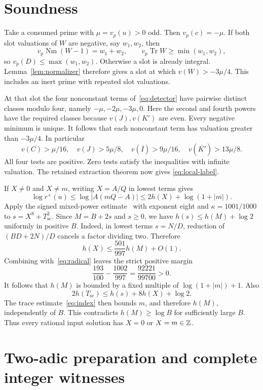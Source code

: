 \documentclass[11pt,a4paper]{article}
\DeclareMathOperator{\Tr}{Tr}\DeclareMathOperator{\Nm}{Nm}
\begin{document}
\section{Soundness}

Take a consumed prime with $\mu=v_p(u)>0$ odd. Then $v_p(c)=-\mu$.
If both slot valuations of $W$ are negative, say $w_1,w_2$, then
\[
 v_p\Nm(W-1)=w_1+w_2,\qquad
 v_p\Tr W\ge\min(w_1,w_2),
\]
so $v_p(D)\le\max(w_1,w_2)$. Otherwise a slot is already integral.
Lemma~\ref{lem:normalizer} therefore gives a slot at which
$v(W)>-3\mu/4$. This includes an inert prime with repeated slot
valuations.

At that slot the four nonconstant terms of~\eqref{eq:detector} have
pairwise distinct classes modulo four, namely $-\mu,-2\mu,-3\mu,0$.
Here the second and fourth powers have the required classes because
$v(J),v(K')$ are even. Every negative minimum is unique. It follows
that each nonconstant term has valuation greater than $-3\mu/4$.
In particular
\[
 v(C)>\mu/16,\quad v(J)>5\mu/8,\quad
 v(\overline I)>9\mu/16,\quad v(\overline{K'})>13\mu/8.
\]
All four tests are positive. Zero tests satisfy the inequalities with
infinite valuation. The retained extraction theorem now gives
\eqref{eq:local-label}.

If $X\ne0$ and $X\ne m$, writing $X=A/Q$ in lowest terms gives
\[
 \log r^+(u)\le\log|A(mQ-A)|
             \le2h(X)+\log(1+|m|).
\]
Apply the signed mixed-power estimate~\cite{v58} with exponent eight
and $\kappa=1001/1000$ to $s=X^8+T_{\mathrm{sc}}^2$. Since
$M=B+2s$ and $s\ge0$, we have $h(s)\le h(M)+\log2$ uniformly
in positive $B$. Indeed, in lowest terms $s=N/D$, reduction of
$(BD+2N)/D$ cancels a factor dividing two. Therefore
\[
 h(X)\le\frac{501}{997}h(M)+O(1).
\]
Combining with~\eqref{eq:radical} leaves the strict positive margin
\[
 \frac{193}{100}-\frac{1002}{997}
                       =\frac{92221}{99700}>0.
\]
It follows that $h(M)$ is bounded by a fixed multiple of
$\log(1+|m|)+1$. Also
\[
 2h(T_{\mathrm{sc}})\le h(s)+8h(X)+\log2.
\]
The trace estimate~\eqref{eq:index} then bounds $m$, and therefore
$h(M)$, independently of $B$. This contradicts $h(M)\ge\log B$
for sufficiently large $B$. Thus every rational input solution has
$X=0$ or $X=m\in\mathbb Z$.

\section{Two-adic preparation and complete integer witnesses}
\end{document}
